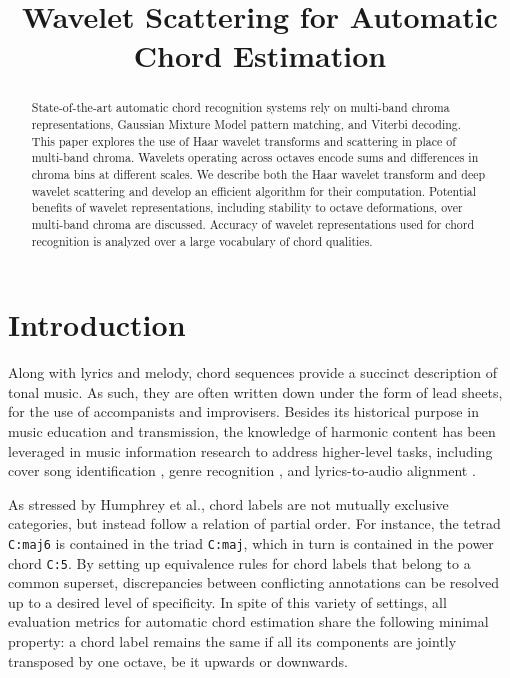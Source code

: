 \documentclass{article}
\title{Wavelet Scattering for Automatic Chord Estimation}
\makeatletter
\newcommand*{\etal}{et al.\@\xspace}
\makeatother
\begin{document}
%
\maketitle
%
\begin{abstract}
State-of-the-art automatic chord recognition systems rely on multi-band chroma representations,
Gaussian Mixture Model pattern matching, and Viterbi decoding.
This paper explores the use of Haar wavelet transforms and scattering in place of multi-band
chroma. Wavelets operating across octaves encode sums and differences in chroma bins at
different scales.
We describe both the Haar wavelet transform and deep wavelet scattering and develop an
efficient algorithm for their computation. Potential benefits of wavelet representations,
including stability to octave deformations, over multi-band chroma are discussed.
Accuracy of wavelet representations used for chord recognition is analyzed over a large
vocabulary of chord qualities.
\end{abstract}


\section{Introduction}\label{sec:introduction}
Along with lyrics and melody, chord sequences provide a succinct description of tonal music.
As such, they are often written down under the form of lead sheets, for the use of
accompanists and improvisers.
Besides its historical purpose in music education and transmission, the knowledge of
harmonic content has been leveraged in music information research to address higher-level
tasks, including cover song identification \cite{ellis2007identifying},
genre recognition \cite{perez2009genre}, and lyrics-to-audio alignment
\cite{mauch2012integrating}.

As stressed by Humphrey \etal \cite{humphrey2015four}, chord labels
are not mutually exclusive categories, but instead follow a relation of partial order.
For instance, the tetrad \texttt{C:maj6} is contained in the triad
\texttt{C:maj}, which in turn is contained in the power chord \texttt{C:5}.
By setting up equivalence rules for chord labels that belong to a common
superset, discrepancies between conflicting annotations can be resolved
up to a desired level of specificity.
In spite of this variety of settings, all evaluation metrics for automatic
chord estimation share the following minimal property:
a chord label remains the same if all its components are jointly
transposed by one octave, be it upwards or downwards.
\end{document}
